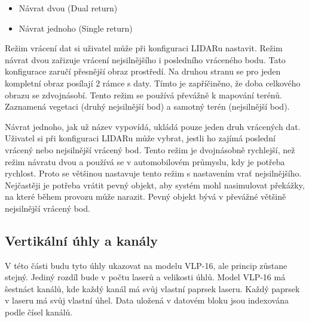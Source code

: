 \documentclass[czech,bachelor,dept420,male,cpdeclaration]{diploma}
\begin{document}
	\begin{itemize}
		\item Návrat dvou (Dual return)
		\item Návrat jednoho (Single return)
	\end{itemize}
	
Režim vrácení dat si uživatel může při konfiguraci LIDARu nastavit. Režim návrat dvou zařizuje vrácení nejsilnějšího i posledního vráceného bodu. Tato konfigurace zaručí přesnější obraz prostředí. Na druhou stranu se pro jeden kompletní obraz posílají \num{2} rámce s daty.  Tímto je zapříčiněno, že doba celkového obrazu se zdvojnásobí. Tento režim se používá převážně k mapování terénů. Zaznamená vegetaci (druhý nejsilnější bod) a samotný terén (nejsilnější bod).

Návrat jednoho, jak už název vypovídá, ukládá pouze jeden druh vrácených dat. Uživatel si při konfiguraci LIDARu může vybrat, jestli ho zajímá poslední vrácený nebo nejsilnější vrácený bod. Tento režim je dvojnásobně rychlejší, než režim návratu dvou a používá se v automobilovém průmyslu, kdy je potřeba rychlost. Proto se většinou nastavuje tento režim s nastavením vrať nejsilnějšího. Nejčastěji je potřeba vrátit pevný objekt, aby systém mohl nasimulovat překážky, na které během provozu může narazit. Pevný objekt bývá v převážné většině nejsilnější vrácený bod. 

\subsection{Vertikální úhly a kanály}
V této části budu tyto úhly ukazovat na modelu VLP-16, ale princip zůstane stejný. Jediný rozdíl bude v počtu laserů a velikosti úhlů. Model VLP-16 má šestnáct kanálů, kde každý kanál má svůj vlastní paprsek laseru. Každý paprsek v laseru má svůj vlastní úhel. Data uložená v datovém bloku jsou indexována podle čísel kanálů.
\end{document}
